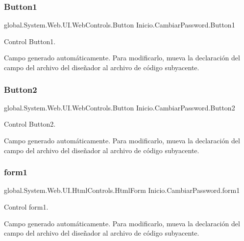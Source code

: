 \subsubsection{\texorpdfstring{Button1}{Button1}}
{\footnotesize\ttfamily global.\+System.\+Web.\+U\+I.\+Web\+Controls.\+Button Inicio.\+Cambiar\+Password.\+Button1\hspace{0.3cm}{\ttfamily [protected]}}



Control Button1. 

Campo generado automáticamente. Para modificarlo, mueva la declaración del campo del archivo del diseñador al archivo de código subyacente. \mbox{\label{classInicio_1_1CambiarPassword_ab2a855fe05cc706ac07c6308af3dcc54}} 
\subsubsection{\texorpdfstring{Button2}{Button2}}
{\footnotesize\ttfamily global.\+System.\+Web.\+U\+I.\+Web\+Controls.\+Button Inicio.\+Cambiar\+Password.\+Button2\hspace{0.3cm}{\ttfamily [protected]}}



Control Button2. 

Campo generado automáticamente. Para modificarlo, mueva la declaración del campo del archivo del diseñador al archivo de código subyacente. \mbox{\label{classInicio_1_1CambiarPassword_a14ad331c75f392329019b277a2d2c8d9}} 
\subsubsection{\texorpdfstring{form1}{form1}}
{\footnotesize\ttfamily global.\+System.\+Web.\+U\+I.\+Html\+Controls.\+Html\+Form Inicio.\+Cambiar\+Password.\+form1\hspace{0.3cm}{\ttfamily [protected]}}



Control form1. 

Campo generado automáticamente. Para modificarlo, mueva la declaración del campo del archivo del diseñador al archivo de código subyacente. \mbox{\label{classInicio_1_1CambiarPassword_a54fe9058b0b1415263161ac543de2e4f}} 
